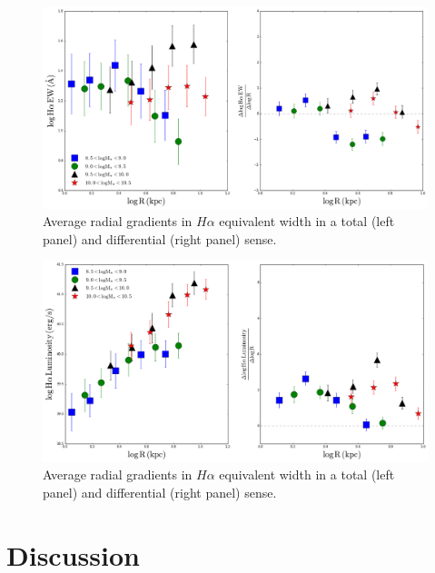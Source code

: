 \documentclass[iop]{emulateapj}
\begin{document}
\begin{figure}
	\centering
	\includegraphics[width=1.5 \columnwidth]{gradients_HA.png}
	\caption{Average radial gradients in $H\alpha$ equivalent width in a total (left panel) and differential (right panel) sense. }
     \label{fig:grad_EW}

\end{figure}

\begin{figure}
	\centering
	\includegraphics[width=1.5 \columnwidth]{gradients_HA_Lum.png}
	\caption{Average radial gradients in $H\alpha$ equivalent width in a total (left panel) and differential (right panel) sense. }
     \label{fig:grad_lum}

\end{figure}

\section{Discussion}
\end{document}

